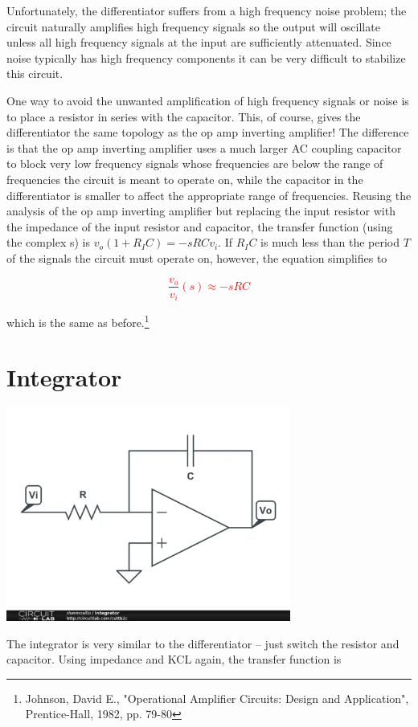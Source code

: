 Unfortunately, the differentiator suffers from a high frequency noise problem; the circuit naturally amplifies high frequency signals so the output will oscillate unless all high frequency signals at the input are sufficiently attenuated. Since noise typically has high frequency components it can be very difficult to stabilize this circuit.
\par One way to avoid the unwanted amplification of high frequency signals or noise is to place a resistor in series with the capacitor. This, of course, gives the differentiator the same topology as the op amp inverting amplifier! The difference is that the op amp inverting amplifier uses a much larger AC coupling capacitor to block very low frequency signals whose frequencies are below the range of frequencies the circuit is meant to operate on, while the capacitor in the differentiator is smaller to affect the appropriate range of frequencies. Reusing the analysis of the op amp inverting amplifier but replacing the input resistor with the impedance of the input resistor and capacitor, the transfer function (using the complex s) is $v_{o}(1+R_{I}C) = -sRCv_{i}$. If $R_{I}C$ is much less than the period $T$ of the signals the circuit must operate on, however, the equation simplifies to

\textcolor{red}{
\begin{equation}
\frac{v_{o}}{v_{i}}(s) \approx -sRC
\label{eq:differentiator_series_cap}
\end{equation}
}

which is the same as before.\footnote{Johnson, David E., "Operational Amplifier Circuits: Design and Application", Prentice-Hall, 1982, pp. 79-80}

\section{Integrator}
\begin{center}
	\includegraphics[width=0.70\textwidth]{schematics/integrator.PNG}
\end{center}
The integrator is very similar to the differentiator -- just switch the resistor and capacitor. Using impedance and KCL again, the transfer function is

